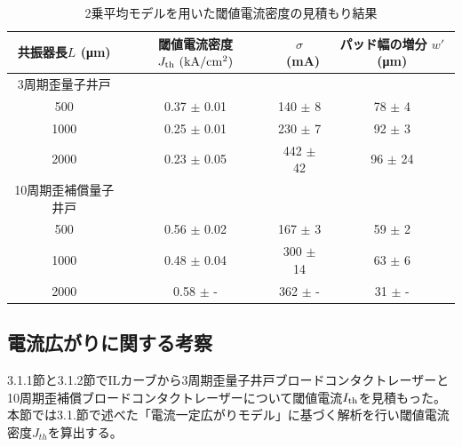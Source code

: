 \begin{table}[h]
  \caption{2乗平均モデルを用いた閾値電流密度の見積もり結果}
  \label{table:table_w_prime}
  \centering
  \begin{tabular}{cccc}
    \hline
    共振器長$L$ (\si{\micro\metre})  &  閾値電流密度 $J_{\rm{th}} \ (\si{kA/cm^2})$ &$\sigma$\ (\si{mA})& パッド幅の増分  $w'$ (\si{\micro\metre}) \\
    \hline \hline
    3周期歪量子井戸\\
     500 & 0.37 $\pm$ 0.01 & 140 $\pm$ 8&78 $\pm$ 4\\
    1000  & 0.25 $\pm$ 0.01& 230 $ \pm$ 7&92 $\pm$ 3\\
    2000  & 0.23 $\pm$ 0.05& 442 $ \pm$ 42 &96 $\pm$ 24\\
    10周期歪補償量子井戸\\ 
      500 & 0.56 $\pm$ 0.02& 167 $\pm$ 3 &59 $\pm$ 2\\
    1000  & 0.48 $\pm$ 0.04& 300 $\pm$ 14 &63 $\pm$ 6\\
    2000  & 0.58 $\pm$ - & 362 $\pm$ - &31 $\pm$ -\\ 
    \hline
  \end{tabular}
\end{table}

\subsection{電流広がりに関する考察}%
3.1.1節と3.1.2節でILカーブから3周期歪量子井戸ブロードコンタクトレーザーと10周期歪補償ブロードコンタクトレーザーについて閾値電流$I_{\rm{th}}$を見積もった。本節では3.1.節で述べた「電流一定広がりモデル」に基づく解析を行い閾値電流密度$J_{th}$を算出する。



